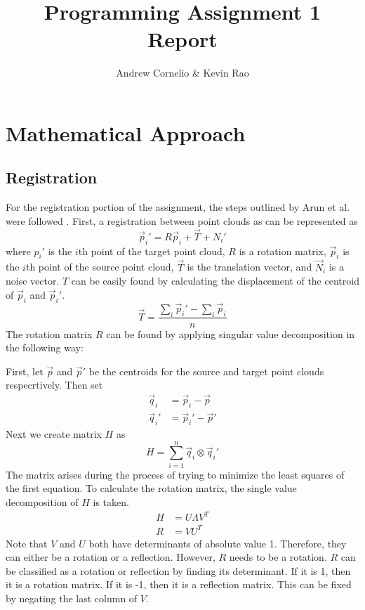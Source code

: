 \documentclass[12pt,letterpaper]{scrartcl}
\author{Andrew Cornelio \& Kevin Rao}
\title{Programming Assignment 1 Report}
\begin{document}
    
	\maketitle
	
	\section{Mathematical Approach}

	\subsection{Registration}
	    For the registration portion of the assignment, the steps outlined by Arun et al. were followed \cite{4767965}.  First, a registration between point clouds as can be represented as
        \[\vec{p}_i' = R\vec{p}_i + \vec{T} + N_i'\]
        where $p_i'$ is the $i$th point of the target point cloud, $R$ is a rotation matrix, $\vec{p}_i$ is the $i$th point of the source point cloud, $\vec{T}$ is the translation vector, and $\vec{N}_i$ is a noise vector. 
        $T$ can be easily found by calculating the displacement of the centroid of $\vec{p}_i$ and $\vec{p}_i'$.
        \[\vec{T} = \frac{\sum_i \vec{p}_i' - \sum_i \vec{p}_i}{n}\]
        The rotation matrix $R$ can be found by applying singular value decomposition in the following way:
        
        First, let $\vec{p}$ and $\vec{p}'$ be the centroids for the source and target point clouds respecrtively. 
        Then set 
        \begin{align*}
            \vec{q}_i &= \vec{p}_i - \vec{p}\\
            \vec{q}_i' &= \vec{p}_i'-\vec{p}'
        \end{align*}
        Next we create matrix $H$ as
        \[H = \sum_{i=1}^n \vec{q}_i \otimes \vec{q}_i'\]
        The matrix arises during the process of trying to minimize the least squares of the first equation.
        To calculate the rotation matrix, the single value decomposition of $H$ is taken.
        \begin{align*}
            H &= U \Lambda V^T\\
            R &= VU^T
        \end{align*}
        Note that $V$ and $U$ both have determinants of absolute value 1. Therefore, they can either be a rotation or a reflection.
        However, $R$ needs to be a rotation.
        $R$ can be classified as a rotation or reflection by finding its determinant.
        If it is 1, then it is a rotation matrix. If it is -1, then it is a reflection matrix.
        This can be fixed by negating the last column of $V$.
        
\end{document}

